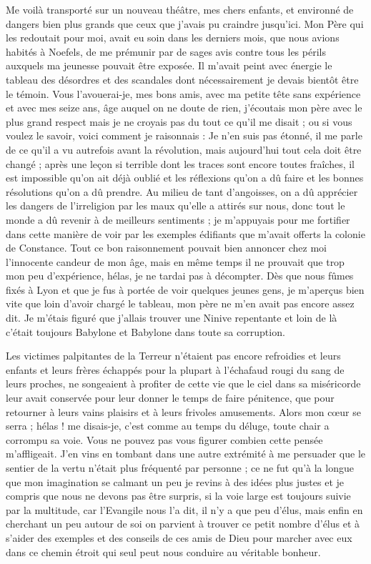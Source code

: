 \documentclass[11pt,a4paper]{report}
\begin{document}
Me voilà transporté sur un nouveau théâtre, mes chers enfants, et environné de dangers bien plus grands que ceux que j'avais pu craindre jusqu'ici. Mon Père qui les redoutait pour moi, avait eu soin dans les derniers mois, que nous avions habités à Noefels, de me prémunir par de sages avis contre tous les périls auxquels ma jeunesse pouvait être exposée. Il m'avait peint avec énergie le tableau des désordres et des scandales dont nécessairement je devais bientôt être le témoin. Vous l'avouerai-je, mes bons amis, avec ma petite tête sans expérience et avec mes seize ans, âge auquel on ne doute de rien, j'écoutais mon père avec le plus grand respect mais je ne croyais pas du tout ce qu'il me disait ; ou si vous voulez le savoir, voici comment je raisonnais : Je n'en suis pas étonné, il me parle de ce qu'il a vu autrefois avant la révolution, mais aujourd'hui tout cela doit être changé ; après une leçon si terrible dont les traces sont encore toutes fraîches, il est impossible qu'on ait déjà oublié et les réflexions qu'on a dû faire et les bonnes résolutions qu'on a dû prendre. Au milieu de tant d'angoisses, on a dû apprécier les dangers de l'irreligion par les maux qu'elle a attirés sur nous, donc tout le monde a dû revenir à de meilleurs sentiments ; je m'appuyais pour me fortifier dans cette manière de voir par les exemples édifiants que m'avait offerts la colonie de Constance. Tout ce bon raisonnement pouvait bien annoncer chez moi l'innocente candeur de mon âge, mais en même temps il ne prouvait que trop mon peu d'expérience, hélas, je ne tardai pas à décompter. Dès que nous fûmes fixés à Lyon et que je fus à portée de voir quelques jeunes gens, je m'aperçus bien vite que loin d'avoir chargé le tableau, mon père ne m'en avait pas encore assez dit. Je m'étais figuré que j'allais trouver une Ninive repentante et loin de là c'était toujours Babylone et Babylone dans toute sa corruption.

Les victimes palpitantes de la Terreur n'étaient pas encore refroidies et leurs enfants et leurs frères échappés pour la plupart à l'échafaud rougi du sang de leurs proches, ne songeaient à profiter de cette vie que le ciel dans sa miséricorde leur avait conservée pour leur donner le temps de faire pénitence, que pour retourner à leurs vains plaisirs et à leurs frivoles amusements. Alors mon cœur se serra ; hélas ! me disais-je, c'est comme au temps du déluge, toute chair a corrompu sa voie. Vous ne pouvez pas vous figurer combien cette pensée m'affligeait. J'en vins en tombant dans une autre extrémité à me persuader que le sentier de la vertu n'était plus fréquenté par personne ; ce ne fut qu'à la longue que mon imagination se calmant un peu je revins à des idées plus justes et je compris que nous ne devons pas être surpris, si la voie large est toujours suivie par la multitude, car l'Evangile nous l'a dit, il n'y a que peu d'élus, mais enfin en cherchant un peu autour de soi on parvient à trouver ce petit nombre d'élus et à s'aider des exemples et des conseils de ces amis de Dieu pour marcher avec eux dans ce chemin étroit qui seul peut nous conduire au véritable bonheur.
\end{document}
